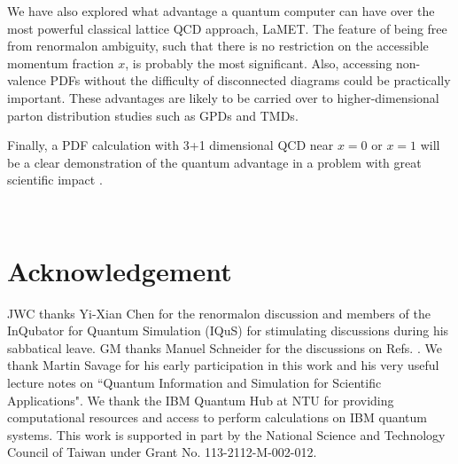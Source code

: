 \documentclass[aps,prd,twocolumn,tightenlines,superscriptaddress,
nofootinbib,preprintnumbers]{revtex4-1}
\newcommand{\Blue}[1]{\textcolor{black}{#1}}
\begin{document}
We have also explored what advantage a quantum computer can have over the most powerful classical lattice QCD approach, LaMET. The feature of being free from renormalon ambiguity, such that there is no restriction on the accessible momentum fraction $x$, is probably the most significant. Also, accessing non-valence PDFs without the difficulty of disconnected diagrams could be practically important. These advantages are likely to be carried over to higher-dimensional parton distribution studies such as GPDs and TMDs. 

Finally, a PDF calculation with 3+1 dimensional QCD near $x=0$ or $x=1$ will be a clear demonstration of the quantum advantage in a problem with great scientific impact \cite{Lin:2017snn}.        








\ \ \







\section*{Acknowledgement}
JWC thanks Yi-Xian Chen for the renormalon discussion
and members of the InQubator for Quantum Simulation (IQuS) for stimulating discussions during his sabbatical leave. GM thanks Manuel Schneider for the discussions on 
Refs. \cite{Schneider:2024yub,Banuls:2025wiq}.
We thank Martin Savage for his early participation in this work and his very useful lecture notes on
``Quantum Information and Simulation for Scientific Applications". We thank the IBM Quantum Hub at NTU for providing computational resources and access to perform calculations on IBM quantum systems. This work is supported in part by the National Science and Technology Council of Taiwan under
Grant No. 113-2112-M-002-012. 

\iffalse

\appendix
\end{document}
